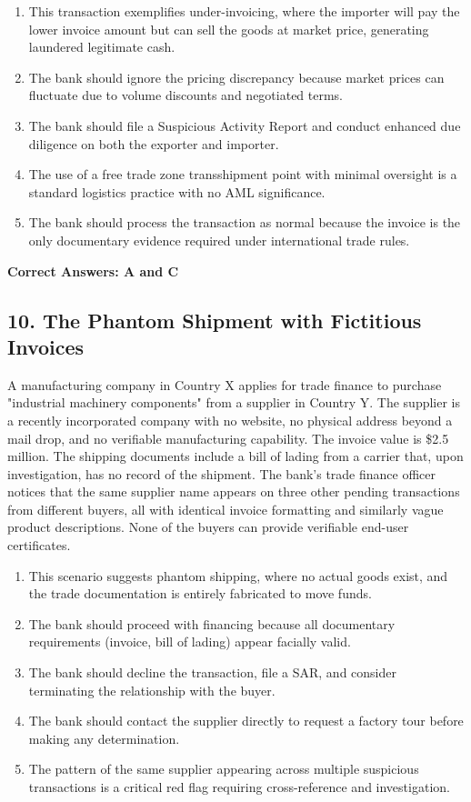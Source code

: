 \documentclass[11pt,a4paper]{article}
\begin{document}
	\begin{enumerate}[label=\Alph*.]
		\item This transaction exemplifies under-invoicing, where the importer will pay the lower invoice amount but can sell the goods at market price, generating laundered legitimate cash.
		\item The bank should ignore the pricing discrepancy because market prices can fluctuate due to volume discounts and negotiated terms.
		\item The bank should file a Suspicious Activity Report and conduct enhanced due diligence on both the exporter and importer.
		\item The use of a free trade zone transshipment point with minimal oversight is a standard logistics practice with no AML significance.
		\item The bank should process the transaction as normal because the invoice is the only documentary evidence required under international trade rules.
	\end{enumerate}
	
	\textbf{Correct Answers: A and C}
	
	\subsection{10. The Phantom Shipment with Fictitious Invoices}
	
	A manufacturing company in Country X applies for trade finance to purchase "industrial machinery components" from a supplier in Country Y. The supplier is a recently incorporated company with no website, no physical address beyond a mail drop, and no verifiable manufacturing capability. The invoice value is \$2.5 million. The shipping documents include a bill of lading from a carrier that, upon investigation, has no record of the shipment. The bank's trade finance officer notices that the same supplier name appears on three other pending transactions from different buyers, all with identical invoice formatting and similarly vague product descriptions. None of the buyers can provide verifiable end-user certificates.
	
	\begin{enumerate}[label=\Alph*.]
		\item This scenario suggests phantom shipping, where no actual goods exist, and the trade documentation is entirely fabricated to move funds.
		\item The bank should proceed with financing because all documentary requirements (invoice, bill of lading) appear facially valid.
		\item The bank should decline the transaction, file a SAR, and consider terminating the relationship with the buyer.
		\item The bank should contact the supplier directly to request a factory tour before making any determination.
		\item The pattern of the same supplier appearing across multiple suspicious transactions is a critical red flag requiring cross-reference and investigation.
	\end{enumerate}
	
\end{document}
